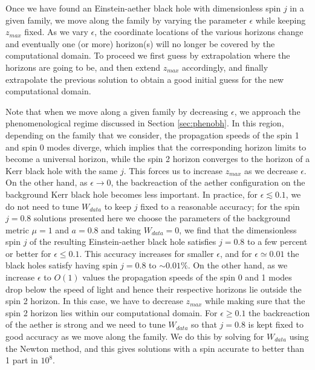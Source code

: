 \documentclass[12pt]{article}
\numberwithin{equation}{section}
\begin{document}
Once we have found an Einstein-aether black hole with dimensionless spin $j$ in a given family, we move along the family by varying the parameter $\epsilon$ while keeping $z_{max}$ fixed. As we vary $\epsilon$, the coordinate locations of the various horizons change and eventually one (or more) horizon(s) will no longer be covered by the computational domain. To  proceed we first guess by extrapolation where the horizons are going to be, and then extend $z_{max}$ accordingly, and finally extrapolate the previous solution to obtain a good initial guess for the new computational domain. 

Note that when we move along a given family by decreasing $\epsilon$, we approach the phenomenological regime discussed in Section \ref{sec:phenobh}. In this region, depending on the family that we consider, the propagation speeds of the spin 1 and spin 0 modes diverge, which implies that the corresponding horizon limits to become a universal horizon, while the spin 2 horizon converges to the horizon of a Kerr black hole with the same $j$. This forces us to increase $z_{max}$ as we decrease $\epsilon$. On the other hand, as $\epsilon\to0$, the backreaction of the aether configuration on the background Kerr black hole becomes less important. In practice, for $\epsilon \lesssim 0.1$, we do not need to tune $W_{data}$ to keep $j$ fixed to a reasonable accuracy; for the spin $j = 0.8$ solutions presented here we choose the parameters of the background metric $\mu=1$ and $a=0.8$ and taking $W_{data} = 0$, we find that the dimensionless spin $j$ of the resulting Einstein-aether black hole satisfies $j=0.8$ to a few percent or better for $\epsilon \le 0.1$. This accuracy increases for smaller $\epsilon$, and for $\epsilon \simeq 0.01$ the black holes satisfy having spin $j = 0.8$ to $\sim 0.01\%$. 
 On the other hand, as we increase $\epsilon$ to $O(1)$ values the propagation speeds of the spin 0 and 1 modes drop below the speed of light 
and hence their respective horizons lie outside the spin 2 horizon. In this case, we have to decrease $z_{max}$ while making sure that the spin 2 horizon lies within our computational domain. For $\epsilon \ge 0.1$ the backreaction of the aether is strong and we need to tune $W_{data}$ so that $j=0.8$ is kept fixed to good accuracy as we move along the family. We do this by solving for $W_{data}$ using the Newton method, and this gives solutions with a spin accurate to better than 1 part in $10^8$.
\end{document}
